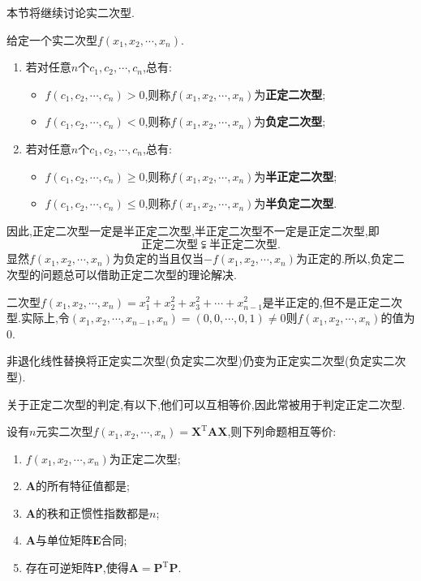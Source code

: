 \documentclass[9pt,a4paper]{book}
\begin{document}
本节将继续讨论实二次型.
\begin{defination}[正定二次型的定义]
	给定一个实二次型$f(x_{1},x_{2},\cdots,x_{n})$.
\begin{enumerate}
\item 
	若对任意$n$个$c_{1},c_{2},\cdots,c_{n}$,总有:
	\begin{itemize}
		\item 	$f(c_{1},c_{2},\cdots,c_{n})>0$,则称$f(x_{1},x_{2},\cdots,x_{n})$为\textbf{正定二次型};
		\item 	$f(c_{1},c_{2},\cdots,c_{n})<0$,则称$f(x_{1},x_{2},\cdots,x_{n})$为\textbf{负定二次型};
	\end{itemize}
\item 
	若对任意$n$个$c_{1},c_{2},\cdots,c_{n}$,总有:
	\begin{itemize}
		\item 	$f(c_{1},c_{2},\cdots,c_{n})\geqslant0$,则称$f(x_{1},x_{2},\cdots,x_{n})$为\textbf{半正定二次型};
		\item 	$f(c_{1},c_{2},\cdots,c_{n})\leqslant0$,则称$f(x_{1},x_{2},\cdots,x_{n})$为\textbf{半负定二次型}.
	\end{itemize}
\end{enumerate}

因此,正定二次型一定是半正定二次型,半正定二次型不一定是正定二次型,即\[  \mbox{正定二次型} \subsetneqq \mbox{半正定二次型}.\]
显然$f(x_{1},x_{2},\cdots,x_{n})$为负定的当且仅当$-f(x_{1},x_{2},\cdots,x_{n})$为正定的.所以,负定二次型的问题总可以借助正定二次型的理论解决.
\end{defination}
\begin{example}
	二次型$f(x_{1},x_{2},\cdots,x_{n})=x_1^2 + x_2^2 + x_3^2 +  \cdots  + x_{n - 1}^2$是半正定的,但不是正定二次型.实际上,令$ ({x_1},{x_2}, \cdots ,{x_{n - 1}},{x_n}) = (0,0, \cdots ,0,1) \ne 0 $则$ f(x_{1},x_{2},\cdots,x_{n}) $的值为$ 0 $.
\end{example}
\begin{feature}
	非退化线性替换将正定实二次型(负定实二次型)仍变为正定实二次型(负定实二次型).
\end{feature}
\begin{theorem}[正定二次型的判定定理]
	关于正定二次型的判定,有以下,他们可以互相等价,因此常被用于判定正定二次型.
	
	设有$ n $元实二次型$f(x_{1},x_{2},\cdots,x_{n})=\bm{X}^{\mathrm{T}}\bm{AX}$,则下列命题相互等价:
	\begin{enumerate}
		\item $f(x_{1},x_{2},\cdots,x_{n})$为正定二次型;
		\item $ \bm{A} $的所有特征值都是;
		\item $ \bm{A} $的秩和正惯性指数都是$ n $;
		\item $ \bm{A} $与单位矩阵$ \bm{E} $合同;
		\item 存在可逆矩阵$ \bm{P} $,使得$ \bm{A}=\bm{P}^{\mathrm{T}}\bm{P} $.
	\end{enumerate}
\end{theorem}
\end{document}
